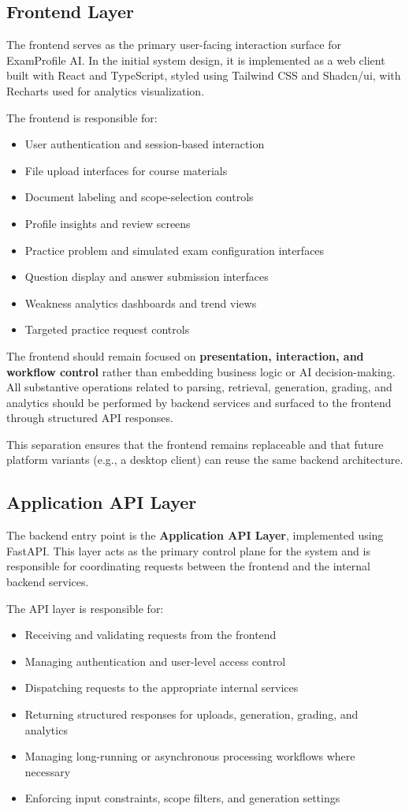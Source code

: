\documentclass[11pt]{article}
\begin{document}
\subsection{Frontend Layer}
The frontend serves as the primary user-facing interaction surface for ExamProfile AI. In the initial system design, it is implemented as a web client built with React and TypeScript, styled using Tailwind CSS and Shadcn/ui, with Recharts used for analytics visualization.

The frontend is responsible for:
\begin{itemize}
\item User authentication and session-based interaction
\item File upload interfaces for course materials
\item Document labeling and scope-selection controls
\item Profile insights and review screens
\item Practice problem and simulated exam configuration interfaces
\item Question display and answer submission interfaces
\item Weakness analytics dashboards and trend views
\item Targeted practice request controls
\end{itemize}

The frontend should remain focused on \textbf{presentation, interaction, and workflow control} rather than embedding business logic or AI decision-making. All substantive operations related to parsing, retrieval, generation, grading, and analytics should be performed by backend services and surfaced to the frontend through structured API responses.

This separation ensures that the frontend remains replaceable and that future platform variants (e.g., a desktop client) can reuse the same backend architecture.

\subsection{Application API Layer}
The backend entry point is the \textbf{Application API Layer}, implemented using FastAPI. This layer acts as the primary control plane for the system and is responsible for coordinating requests between the frontend and the internal backend services.

The API layer is responsible for:
\begin{itemize}
\item Receiving and validating requests from the frontend
\item Managing authentication and user-level access control
\item Dispatching requests to the appropriate internal services
\item Returning structured responses for uploads, generation, grading, and analytics
\item Managing long-running or asynchronous processing workflows where necessary
\item Enforcing input constraints, scope filters, and generation settings
\end{itemize}
\end{document}
